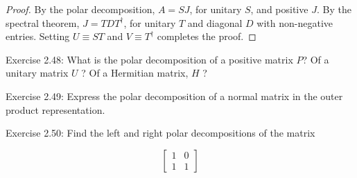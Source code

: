\begin{proof}
    By the polar decomposition, $A=S J$, for unitary $S$, and positive $J$. By the spectral theorem, $J=T D T^{\dagger}$, for unitary $T$ and diagonal $D$ with non-negative entries. Setting $U \equiv S T$ and $V \equiv T^{\dagger}$ completes the proof.
\end{proof}

\begin{exercise}
Exercise 2.48: What is the polar decomposition of a positive matrix $P$? Of a unitary matrix $U$ ? Of a Hermitian matrix, $H$ ?
\end{exercise}

\begin{exercise}
Exercise 2.49: Express the polar decomposition of a normal matrix in the outer product representation.
\end{exercise}

\begin{exercise}
Exercise 2.50: Find the left and right polar decompositions of the matrix

\begin{equation}
    \left[\begin{array}{ll}
1 & 0 \\
1 & 1
\end{array}\right]
\end{equation}
\end{exercise}